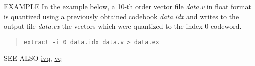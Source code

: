 \begin{options}
\end{options}

\begin{qsection}{EXAMPLE}
In the example below, a 10-th order vector file {\em data.v}
in float format is quantized using a previously obtained
codebook {\em data.idx} and writes to the output file {\em data.ex}
the vectors which were quantized to the index 0 codeword.
\begin{quote}
\verb!extract -i 0 data.idx data.v > data.ex!
\end{quote}
\end{qsection}

\begin{qsection}{SEE ALSO}
\hyperlink{ivq}{ivq},
\hyperlink{vq}{vq}
\end{qsection}
